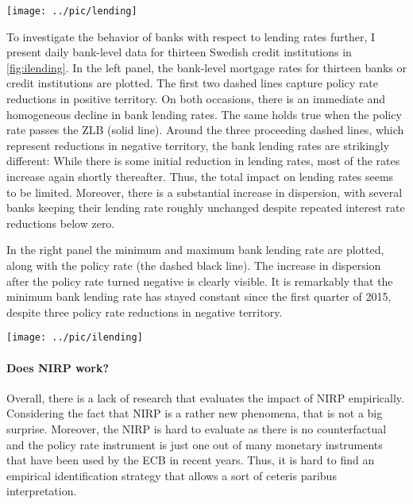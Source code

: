 \begin{center}
\texttt{[image: ../pic/lending]}
\label{fig:lending}
\end{center}

To investigate the behavior of banks with respect to lending rates further, I present daily bank-level data for thirteen Swedish credit institutions in \autoref{fig:ilending}.
In the left panel, the bank-level mortgage rates for thirteen banks or credit institutions are plotted. The first two dashed lines capture policy rate reductions in positive territory. On both occasions, there is an immediate and homogeneous decline in bank lending rates. The same holds true when the policy rate passes the ZLB (solid line). Around the three proceeding dashed lines, which represent reductions in negative territory, the bank lending rates are strikingly different: While there is some initial reduction in lending rates, most of the rates increase again shortly thereafter. Thus, the total impact on lending rates seems to be limited. Moreover, there is a substantial increase in dispersion, with several banks keeping their lending rate roughly unchanged despite repeated interest rate reductions below zero. 

In the right panel the minimum and maximum bank lending rate are plotted, along with the policy rate (the dashed black line). The increase in dispersion after the policy rate turned negative is clearly visible. It is remarkably that the minimum bank lending rate has stayed constant since the first quarter of 2015, despite three policy rate reductions in negative territory.



\begin{center}
\texttt{[image: ../pic/ilending]}
\label{fig:ilending}
\end{center}


\paragraph{Does NIRP work?}
Overall, there is a lack of research that evaluates the impact of NIRP empirically. Considering the fact that NIRP is a rather new phenomena, that is not a big surprise. Moreover, the NIRP is hard to evaluate as there is no counterfactual and the policy rate instrument is just one out of many monetary instruments that have been used by the ECB in recent years. Thus, it is hard to find an empirical identification strategy that allows a sort of ceteris paribus interpretation.

